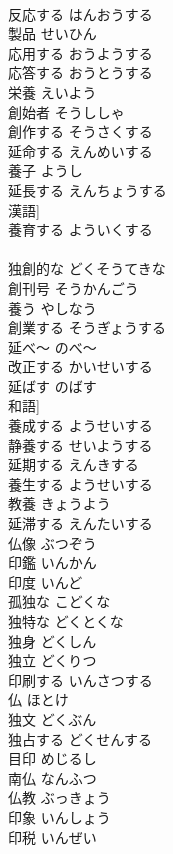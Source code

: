 \documentclass[8pt]{extreport}
\begin{document}
\begin{CJK}{UTF8}{min}
\\	反応する	はんおうする	
\\	製品	せいひん	
\\	応用する	おうようする	
\\	応答する	おうとうする	
\\	栄養	えいよう	
\\	創始者	そうししゃ	
\\	創作する	そうさくする	
\\	延命する	えんめいする	
\\	養子	ようし	
\\	延長する	えんちょうする	
\\	漢語]
\\	養育する	よういくする	
\\	[漢語]
\\	独創的な	どくそうてきな	
\\	創刊号	そうかんごう	
\\	養う	やしなう	
\\	創業する	そうぎょうする	
\\	延べ～	のべ～	
\\	改正する	かいせいする	
\\	延ばす	のばす	
\\	和語]
\\	養成する	ようせいする	
\\	静養する	せいようする	
\\	延期する	えんきする	
\\	養生する	ようせいする	
\\	教養	きょうよう	
\\	延滞する	えんたいする	
\\	仏像	ぶつぞう	
\\	印鑑	いんかん	
\\	印度	いんど	
\\	孤独な	こどくな	
\\	独特な	どくとくな	
\\	独身	どくしん	
\\	独立	どくりつ	
\\	印刷する	いんさつする	
\\	仏	ほとけ	
\\	独文	どくぶん	
\\	独占する	どくせんする	
\\	目印	めじるし	
\\	南仏	なんふつ	
\\	仏教	ぶっきょう	
\\	印象	いんしょう	
\\	印税	いんぜい	

\end{CJK}
\end{document}
